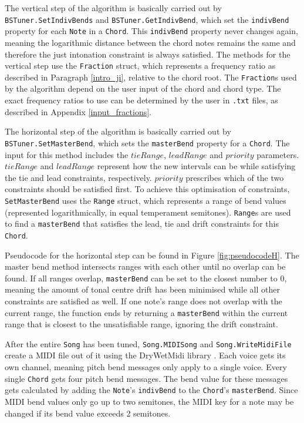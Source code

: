 \documentclass[a4paper]{article}
\begin{document}
\begin{sloppypar}
The vertical step of the algorithm is basically carried out by \texttt{BSTuner.SetIndivBends} and \texttt{BSTuner.GetIndivBend}, which set the \texttt{indivBend} property for each \texttt{Note} in a \texttt{Chord}. This \texttt{indivBend} property never changes again, meaning the logarithmic distance between the chord notes remains the same and therefore the just intonation constraint is always satisfied. The methods for the vertical step use the \texttt{Fraction} struct, which represents a frequency ratio as described in Paragraph \ref{intro_ji}, relative to the chord root. The \texttt{Fraction}s used by the algorithm depend on the user input of the chord and chord type. The exact frequency ratios to use can be determined by the user in \texttt{.txt} files, as described in Appendix \ref{input_fractions}.

The horizontal step of the algorithm is basically carried out by \texttt{BSTuner.SetMasterBend}, which sets the \texttt{masterBend} property for a \texttt{Chord}. The input for this method includes the $\mathit{tieRange}$, $\mathit{leadRange}$ and $\mathit{priority}$ parameters. $\mathit{tieRange}$ and $\mathit{leadRange}$ represent how  the new intervals can be while satisfying the tie and lead constraints, respectively. $\mathit{priority}$ prescribes which of the two constraints should be satisfied first. To achieve this optimisation of constraints, \texttt{SetMasterBend} uses the \texttt{Range} struct, which represents a range of bend values (represented logarithmically, in equal temperament semitones). \texttt{Range}s are used to find a \texttt{masterBend} that satisfies the lead, tie and drift constraints for this \texttt{Chord}.
\end{sloppypar}

Pseudocode for the horizontal step can be found in Figure \ref{fig:pseudocodeH}. The master bend method intersects ranges with each other until no overlap can be found. If all ranges overlap, \texttt{masterBend} can be set to the closest number to 0, meaning the amount of tonal centre drift has been minimised while all other constraints are satisfied as well. If one note's range does not overlap with the current range, the function ends by returning a \texttt{masterBend} within the current range that is closest to the unsatisfiable range, ignoring the drift constraint.

After the entire \texttt{Song} has been tuned, \texttt{Song.MIDISong} and \texttt{Song.WriteMidiFile} create a MIDI file out of it using the DryWetMidi library \cite{dobroselsky_melanchalldrywetmidi_2023}. Each voice gets its own channel, meaning pitch bend messages only apply to a single voice. Every single \texttt{Chord} gets four pitch bend messages. The bend value for these messages gets calculated by adding the \texttt{Note}'s \texttt{indivBend} to the \texttt{Chord}'s \texttt{masterBend}. Since MIDI bend values only go up to two semitones, the MIDI key for a note may be changed if its bend value exceeds 2 semitones.
\end{document}
